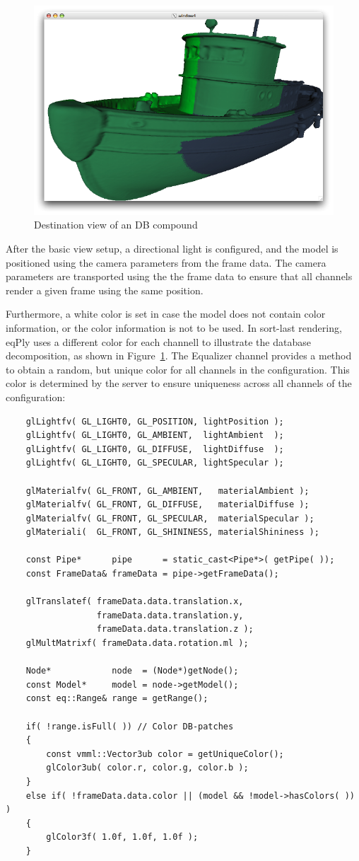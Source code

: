 \documentclass[10pt,a4]{scrartcl}
\newcommand{\fig}[1]{Figure~\ref{#1}}
\begin{document}
\begin{figure}
  \includegraphics[width=.4\textwidth]{images/DB.pdf}
  {\caption{\small\label{fDB}Destination view of an DB compound}}
\end{figure}
After the basic view setup, a directional light is configured, and the
model is positioned using the camera parameters from the frame data. The
camera parameters are transported using the the frame data to ensure
that all channels render a given frame using the same position.

Furthermore, a white color is set in case the model does not contain
color information, or the color information is not to be used. In
sort-last rendering, \textsf{eqPly} uses a different color for each
channell to illustrate the database decomposition, as shown in
\fig{fDB}. The Equalizer channel provides a method to obtain a random,
but unique color for all channels in the configuration. This color is
determined by the server to ensure uniqueness across all channels of the
configuration:

{\footnotesize\begin{lstlisting}
    glLightfv( GL_LIGHT0, GL_POSITION, lightPosition );
    glLightfv( GL_LIGHT0, GL_AMBIENT,  lightAmbient  );
    glLightfv( GL_LIGHT0, GL_DIFFUSE,  lightDiffuse  );
    glLightfv( GL_LIGHT0, GL_SPECULAR, lightSpecular );

    glMaterialfv( GL_FRONT, GL_AMBIENT,   materialAmbient );
    glMaterialfv( GL_FRONT, GL_DIFFUSE,   materialDiffuse );
    glMaterialfv( GL_FRONT, GL_SPECULAR,  materialSpecular );
    glMateriali(  GL_FRONT, GL_SHININESS, materialShininess );

    const Pipe*      pipe      = static_cast<Pipe*>( getPipe( ));
    const FrameData& frameData = pipe->getFrameData();

    glTranslatef( frameData.data.translation.x,
                  frameData.data.translation.y,
                  frameData.data.translation.z );
    glMultMatrixf( frameData.data.rotation.ml );

    Node*            node  = (Node*)getNode();
    const Model*     model = node->getModel();
    const eq::Range& range = getRange();

    if( !range.isFull( )) // Color DB-patches
    {
        const vmml::Vector3ub color = getUniqueColor();
        glColor3ub( color.r, color.g, color.b );
    }
    else if( !frameData.data.color || (model && !model->hasColors( )) )
    {
        glColor3f( 1.0f, 1.0f, 1.0f );
    }
    
\end{lstlisting}}
\end{document}
